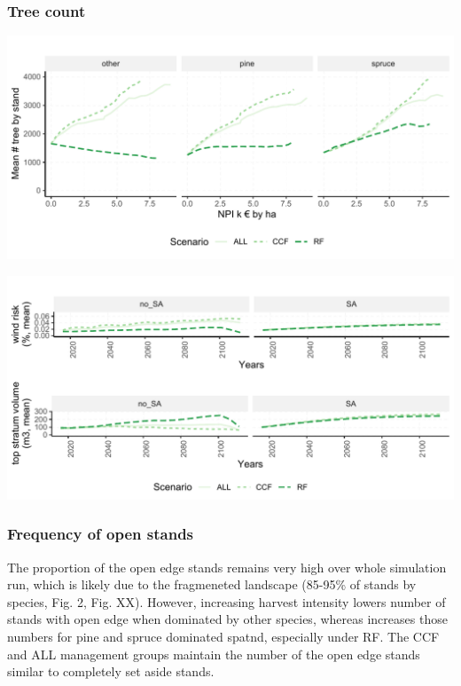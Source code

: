 \documentclass[]{elsarticle} %
\makeatletter
\def\maxwidth{\ifdim\Gin@nat@width>\linewidth\linewidth
\else\Gin@nat@width\fi}
\let\Oldincludegraphics\includegraphics
\renewcommand{\includegraphics}[1]{\Oldincludegraphics[width=\maxwidth]{#1}}
\makeatother
\begin{document}
\subsubsection{Tree count}\label{tree-count}

\includegraphics{test_manus_files/figure-latex/mean_tree_n-1.pdf}

\includegraphics{test_manus_files/figure-latex/wind_risk_SA-1.pdf}

\subsubsection{Frequency of open stands}\label{frequency-of-open-stands}

The proportion of the open edge stands remains very high over whole
simulation run, which is likely due to the fragmeneted landscape
(85-95\% of stands by species, Fig. 2, Fig. XX). However, increasing
harvest intensity lowers number of stands with open edge when dominated
by other species, whereas increases those numbers for pine and spruce
dominated spatnd, especially under RF. The CCF and ALL management groups
maintain the number of the open edge stands similar to completely set
aside stands.
\end{document}
